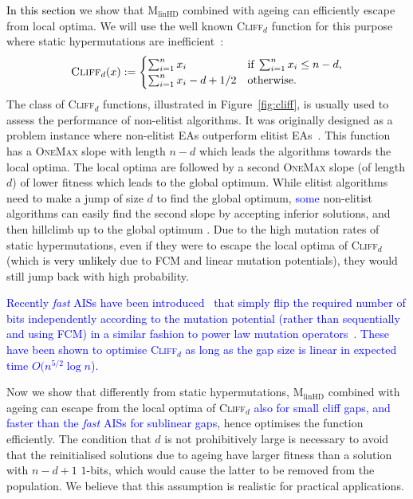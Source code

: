 \documentclass[lettersize,journal]{IEEEtran}
\newcommand{\new}[1]{\textcolor{black}{#1}}
\newcommand{\rev}[1]{\textcolor{blue}{#1}}
\newcommand{\cliff}{\textsc{Cliff}$_d$}
\newcommand{\linHD}{M$_{\text{linHD}}$}
\begin{document}
\new{ In this section} we show that {\linHD } combined with ageing can efficiently escape from local optima. We will use the well known \cliff{} function for this purpose where static hypermutations are inefficient~\cite{CorusOlivetoYazdani2019TCS}:
\begin{equation} \label{func:cliff}
	\textsc{Cliff}_{d}(x):=\begin{cases}
		\sum_{i=1}^n x_i & \text{if}\; \sum_{i=1}^n x_i \leq n-d, \\
		\sum_{i=1}^n x_i -d+ 1/2 & \text{otherwise.}
	\end{cases}
\end{equation}
The class of \cliff{} functions, illustrated in Figure~\ref{fig:cliff}, is usually used to assess the performance of non-elitist algorithms. It was originally designed as a problem instance where non-elitist EAs outperform elitist EAs~\cite{JaegerskuepperStorch}. This function  has a \textsc{OneMax} slope with length $n-d$ which leads the algorithms towards the local optima. The local optima are followed by a second \textsc{OneMax} slope (of length $d$) of lower fitness which leads to the global optimum. While elitist algorithms need to make a jump of size $d$ to find the global optimum, \rev{some} non-elitist algorithms can easily find the second slope by accepting inferior solutions, and then hillclimb up to the global optimum \cite{LissovoiOlivetoWarwicker2019AAAI,CorusOlivetoYazdani2019TCS,CorusOlivetoYazdani2021TEVC,HeviaSudholtAlgo24,DoerrIJCAI-25}. 
Due to the high mutation rates of static hypermutations, even if they were to escape the local optima of \cliff{} (which is \new{very unlikely} due to FCM and linear mutation potentials), they would still jump back with high probability.  

\textcolor{blue}{Recently {\it fast} AISs have been introduced~\cite{CorusOlivetoYazdani2021TEVC} that simply flip the required number of bits independently according to the mutation potential (rather than sequentially and using FCM) in a similar fashion to power law mutation operators~\cite{DoerrGECCO2017FastGA}. These have been shown to optimise \cliff{} as long as the gap size is linear in expected time $O(n^{5/2} \log n$).
}

Now we show that differently from static hypermutations, {\linHD }
combined with ageing can escape from the local optima of \cliff{} \textcolor{blue}{also for small cliff gaps, and faster than the {\it fast} AISs for sublinear gaps}, 
hence optimises the function efficiently. The condition that $d$ is not prohibitively large is necessary to avoid
that the reinitialised solutions due to ageing have larger fitness than a solution with $n-d+1$ $1$-bits, {\color{black} which would cause the latter to be removed from the population}.
We believe that this assumption is realistic for practical applications. 
\end{document}
